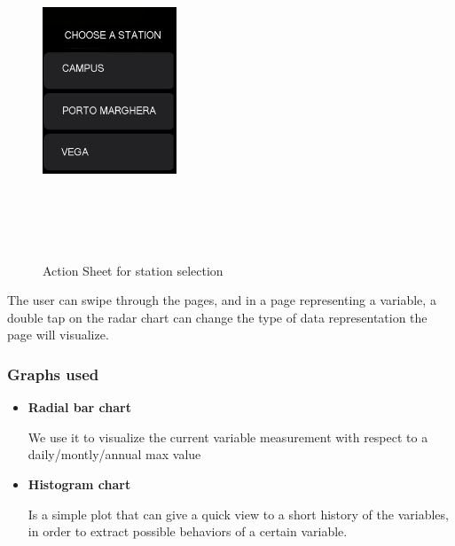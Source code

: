 \documentclass[12pt]{article} %
\begin{document}
\begin{figure}[H]
 \centering
  \includegraphics[width=4cm,height=10cm,keepaspectratio]{img/StationActionSheet.png}
  \hspace{0.05\textwidth}
  \hfill
  \caption{Action Sheet for station selection}
  \label{fig:boat1}
\end{figure}
The user can swipe through the pages, and in a page representing a variable, a double tap on 
the radar chart can change the type of data representation the page will visualize.

\subsubsection{Graphs used}
\begin{itemize}
\item \textbf{Radial bar chart}

We use it to visualize the current variable measurement with respect to a daily/montly/annual max value
\item \textbf{Histogram chart}

Is a simple plot that can give a quick view to a short history of the variables, in order to extract possible behaviors of a certain variable.
\end{itemize}
\end{document}
